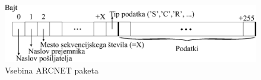 \begin{figure}[!h]
	\centering
	\includegraphics[scale=0.5]{./Slike/arcnet-packet.eps}
	\caption{Vsebina ARCNET paketa}
	\label{fig:arcnet-packet}
\end{figure}
